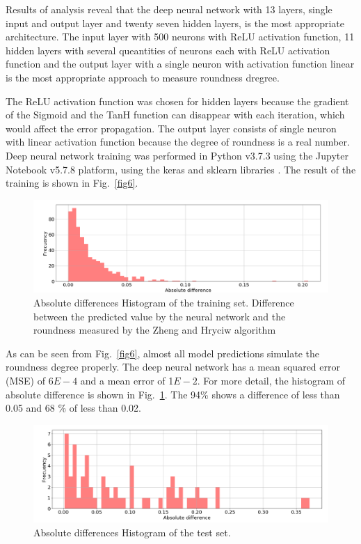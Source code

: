 \documentclass[conference]{IEEEtran}
\begin{document}
Results of analysis reveal that the deep neural network with 13 layers, single input and output layer and twenty seven hidden layers, is the most appropriate architecture. The input layer with 500 neurons with ReLU activation function, 11 hidden layers with several queantities of neurons each with ReLU activation function and the output layer with a single neuron with activation function linear is the most appropriate approach to measure roundness dregree. 

The ReLU activation function was chosen for hidden layers because the gradient of the Sigmoid and the TanH function can disappear with each iteration, which would affect the error propagation. The output layer consists of single neuron with linear activation function because the degree of roundness is a real number. Deep neural network training was performed in Python v3.7.3 using the Jupyter Notebook v5.7.8 platform, using the keras and sklearn libraries \cite{b13}. The result of the training is shown in Fig.~\ref{fig6}.

\begin{figure}[htbp]
	\centerline{\includegraphics[scale=0.35]{fig7.png}}
	\caption{Absolute differences Histogram of the training set. Difference between the predicted value by the neural network and the roundness measured by the Zheng and Hryciw algorithm}
	\label{fig7}
\end{figure}


As can be seen from Fig.~\ref{fig6}, almost all model predictions simulate the roundness degree properly. The deep neural network has a mean squared error (MSE) of 6$E-4$ and a mean error of 1$E-2$. For more detail, the histogram of absolute difference is shown in Fig.~\ref{fig7}. The 94\% shows a difference of less than 0.05 and 68 \% of less than 0.02.

\begin{figure}[htbp]
	\centerline{\includegraphics[scale=0.35]{fig8.png}}
	\caption{Absolute differences Histogram of the test set.}
	\label{fig8}
\end{figure}
\end{document}
